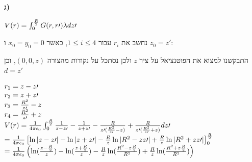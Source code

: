 \documentclass[14pt]{extarticle}
\makeatletter
\newenvironment{lefteqs}{%
    \begin{english}%
    \begin{flushleft}%
    \renewcommand{\arraystretch}{1.3}%
    $\begin{array}{@{}l@{}}%
}{%
    \end{array}$%
    \end{flushleft}%
    \end{english}%
}
\makeatother
\begin{document}
\textbf{ג)}

\begin{lefteqs}
    V(r) = \int_0^{\frac{R}{2}} G(r,r\prime) \lambda dz\prime 
\end{lefteqs}
נחשב את $r_i$ עבור $1 \leq i \leq 4$, כאשר $x_0=y_0=0$ ו $z_0=z\prime$:

התבקשנו למצוא את הפוטנציאל על ציר $z$ ולכן נסתכל על נקודות מהצורה $(0,0,z)$, וכן $d=z\prime$

\begin{lefteqs}
    r_1 = z - z\prime \\
    r_2 = z + z\prime \\
    r_3 = \frac{R^2}{z\prime} - z \\
    r_4 = \frac{R^2}{z\prime} + z \\
    V(r) = \frac{1}{4\pi\epsilon_0} \int_0^{\frac{R}{2}} \frac{1}{z-z\prime} - \frac{1}{z+z\prime} - \frac{R}{z\prime(\frac{R^2}{z\prime} - z)} + \frac{R}{z\prime(\frac{R^2}{z\prime} + z)} dz\prime \\
    = \frac{1}{4\pi \epsilon_0} \left[ \ln|z-z\prime| - \ln|z+z\prime| - \frac{R}{z}\ln|R^2-zz\prime| + \frac{R}{z}\ln|R^2+zz\prime| \right]_0^{\frac{R}{2}} \\
    = \frac{1}{4\pi \epsilon_0} \left( \ln(\frac{z-\frac{R}{2}}{z}) - \ln(\frac{z+\frac{R}{2}}{z}) - \frac{R}{z}\ln(\frac{R^2-z\frac{R}{2}}{R^2}) + \frac{R}{z}\ln(\frac{R^2+z\frac{R}{2}}{R^2}) \right) \\
\end{lefteqs}
\end{document}
